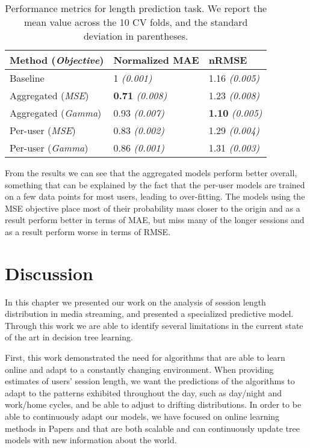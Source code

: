 \begin{table}
	\centering
	\caption{Performance metrics for length prediction task. We report the
		mean value across the 10 CV folds, and the standard deviation in parentheses.}
	\label{tab:session-length-prediction}
	\begin{tabular}{lll}
		\toprule
		Method (\textit{Objective}) & Normalized MAE & nRMSE \\
		\midrule
		Baseline & 1 \textit{(0.001)} & 1.16 \textit{(0.005)} \\
		Aggregated (\textit{MSE}) & \textbf{0.71} \textit{(0.008)} & 1.23 \textit{(0.008)} \\
		Aggregated (\textit{Gamma}) & 0.93 \textit{(0.007)} & \textbf{1.10} \textit{(0.005)} \\
		Per-user (\textit{MSE}) & 0.83 \textit{(0.002)} & 1.29 \textit{(0.004)} \\
		Per-user (\textit{Gamma}) & 0.86 \textit{(0.001)} & 1.31 \textit{(0.003)} \\
		\bottomrule
	\end{tabular}
\end{table}

From the results we can see that the aggregated models perform better overall,
something that can be explained by the fact that the per-user models are trained
on a few data points for most users, leading to over-fitting. The models using the
MSE objective place most of their probability mass closer to the origin and as a
result perform better in terms of MAE, but miss many of the longer sessions
and as a result perform worse in terms of RMSE.

\section{Discussion}
\label{sec:session-length-discussion}

In this chapter we presented our work on the analysis of session
length distribution in media streaming, and presented a specialized
predictive model.
Through this work we are able to identify several limitations in the current
state of the art in decision tree learning.

First, this work demonstrated the need for algorithms that are
able to learn online and adapt to a constantly changing environment. When
providing estimates of users' session length, we want the predictions of
the algorithms to adapt to the patterns exhibited throughout the day,
such as day/night and work/home cycles, and be able to adjust to drifting
distributions.
In order to be able to continuously adapt our models, we have focused on online learning
methods in Papers \boostvhtNum and \uncertaintreesNum that are both scalable and can continuously update tree models with new information about the world.

